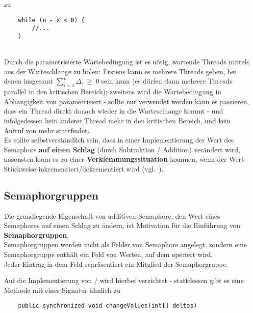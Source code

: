 zu

\begin{verbatim}
    while (n - x < 0) {
        //...
    }
\end{verbatim}\\

\noindent
Durch die parametrisierte Wartebedingung ist es nötig, wartende Threads mittels  aus der Warteschlange zu holen: Erstens kann es mehrere Threads geben, bei denen insgesamt $\sum_{i=1}^{n} \Delta_i\ \geq\ 0$ sein kann (es dürfen dann mehrere Threads parallel in den kritischen Bereich); zweitens wird die Wartebedingung in Abhängigkeit von  parametrisiert - sollte nur  verwendet werden kann es passieren, dass ein Thread direkt danach wieder in die Warteschlange kommt - und infolgedessen kein anderer Thread mehr in den kritischen Bereich, und kein Aufruf von  mehr stattfindet.\\

\noindent
Es sollte selbstverständlich sein, dass in einer Implementierung der Wert des Semaphors \textbf{auf einen Schlag} (durch Subtraktion / Addition) verändert wird, ansonsten kann es zu einer \textbf{Verklemmungssituation} kommen, wenn der Wert Stückweise inkrementiert/dekrementiert wird (vgl.~\cite[109]{Oec22}).

\subsection{Semaphorgruppen}

Die grundlegende Eigenschaft von additiven Semaphore, den Wert eines Semaphores auf einen Schlag zu ändern, ist Motivation für die Einführung von \textbf{Semaphorgruppen}.\\

\noindent
Semaphorgruppen werden nicht als Felder von Semaphore angelegt, sondern eine Semaphorgruppe enthält ein Feld von Werten, auf dem operiert wird.\\

\noindent
Jeder Eintrag in dem Feld repräsentiert ein Mitglied der Semaphorgruppe.


\noindent
Auf die Implementierung von / wird hierbei verzichtet - stattdessen gibt es eine Methode mit einer Signatur ähnlich zu

\begin{verbatim}
    public synchronized void changeValues(int[] deltas)
\end{verbatim}\\

